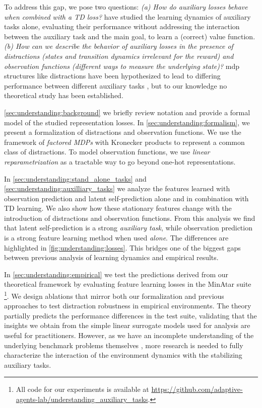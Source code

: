 To address this gap, we pose two questions: \emph{(a) How do auxiliary losses behave when combined with a TD loss?} \textcite{tang2022understanding,lelan2022generalization,tang2023towards} have studied the learning dynamics of auxiliary tasks alone, evaluating their performance without addressing the interaction between the auxiliary task and the main goal, to learn a (correct) value function. \emph{(b) How can we describe the behavior of auxiliary losses in the presence of distractions (states and transition dynamics irrelevant for the reward) and observation functions (different ways to measure the underlying state)?} \ac{mdp}  structures like distractions have been hypothesized to lead to differing performance between different auxiliary tasks \parencite{ni2024bridging}, but to our knowledge no theoretical study has been established.


\autoref{sec:understanding:background} we briefly review notation and provide a formal model of the studied representation losses.
In \autoref{sec:understanding:formalism}, we present a formalization of distractions and observation functions. We use the framework of \emph{factored MDPs} \parencite{boutilier2000stochastic} with Kronecker products \parencite{mahadevan2009learning} to represent a common class of distractions. To model observation functions, we use \emph{linear reparametrization} as a tractable way to go beyond one-hot representations. 

In \autoref{sec:understanding:stand_alone_tasks} and \autoref{sec:understanding:auxilliary_tasks} we analyze the features learned with observation prediction and latent self-prediction alone and in combination with TD learning. 
We also show how these stationary features change with the introduction of distractions and observation functions.
From this analysis we find that latent self-prediction is a strong \emph{auxiliary task}, while observation prediction is a strong feature learning method when used \emph{alone}.
The differences are highlighted in \autoref{fig:understanding:losses}.
This bridges one of the biggest gaps between previous analysis of learning dynamics and empirical results.

In \autoref{sec:understanding:empirical} we test the predictions derived from our theoretical framework by evaluating feature learning losses in the MinAtar suite \parencite{young19minatar}\footnote{All code for our experiments is available at \url{https://github.com/adaptive-agents-lab/understanding_auxiliary_tasks}.}.
We design ablations that mirror both our formalization and previous approaches to test distraction robustness in empirical environments. 
The theory partially predicts the performance differences in the test suite, validating that the insights we obtain from the simple linear surrogate models used for analysis are useful for practitioners.
However, as we have an incomplete understanding of the underlying benchmark problems themselves \parencite{voelcker2024can}, more research is needed to fully characterize the interaction of the environment dynamics with the stabilizing auxiliary tasks.

